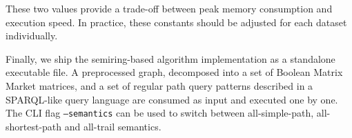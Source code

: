 These two values provide a trade-off between peak memory consumption and execution speed.
In practice, these constants should be adjusted for each dataset individually.

Finally, we ship the semiring-based algorithm implementation as a standalone executable file.
A preprocessed graph, decomposed into a set of Boolean Matrix Market matrices, and a set of regular path query patterns described in a SPARQL-like query language are consumed as input and executed one by one.
The CLI flag \texttt{--semantics} can be used to switch between all-simple-path, all-shortest-path and all-trail semantics.
